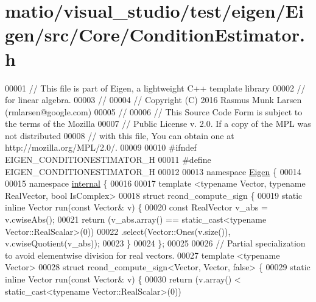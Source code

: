 \hypertarget{matio_2visual__studio_2test_2eigen_2_eigen_2src_2_core_2_condition_estimator_8h_source}{}\section{matio/visual\+\_\+studio/test/eigen/\+Eigen/src/\+Core/\+Condition\+Estimator.h}
\label{matio_2visual__studio_2test_2eigen_2_eigen_2src_2_core_2_condition_estimator_8h_source}

\begin{DoxyCode}
00001 \textcolor{comment}{// This file is part of Eigen, a lightweight C++ template library}
00002 \textcolor{comment}{// for linear algebra.}
00003 \textcolor{comment}{//}
00004 \textcolor{comment}{// Copyright (C) 2016 Rasmus Munk Larsen (rmlarsen@google.com)}
00005 \textcolor{comment}{//}
00006 \textcolor{comment}{// This Source Code Form is subject to the terms of the Mozilla}
00007 \textcolor{comment}{// Public License v. 2.0. If a copy of the MPL was not distributed}
00008 \textcolor{comment}{// with this file, You can obtain one at http://mozilla.org/MPL/2.0/.}
00009 
00010 \textcolor{preprocessor}{#ifndef EIGEN\_CONDITIONESTIMATOR\_H}
00011 \textcolor{preprocessor}{#define EIGEN\_CONDITIONESTIMATOR\_H}
00012 
00013 \textcolor{keyword}{namespace }\hyperlink{namespace_eigen}{Eigen} \{
00014 
00015 \textcolor{keyword}{namespace }\hyperlink{namespaceinternal}{internal} \{
00016 
00017 \textcolor{keyword}{template} <\textcolor{keyword}{typename} Vector, \textcolor{keyword}{typename} RealVector, \textcolor{keywordtype}{bool} IsComplex>
00018 \textcolor{keyword}{struct }rcond\_compute\_sign \{
00019   \textcolor{keyword}{static} \textcolor{keyword}{inline} Vector run(\textcolor{keyword}{const} Vector& v) \{
00020     \textcolor{keyword}{const} RealVector v\_abs = v.cwiseAbs();
00021     \textcolor{keywordflow}{return} (v\_abs.array() == \textcolor{keyword}{static\_cast<}typename Vector::RealScalar\textcolor{keyword}{>}(0))
00022             .select(Vector::Ones(v.size()), v.cwiseQuotient(v\_abs));
00023   \}
00024 \};
00025 
00026 \textcolor{comment}{// Partial specialization to avoid elementwise division for real vectors.}
00027 \textcolor{keyword}{template} <\textcolor{keyword}{typename} Vector>
00028 \textcolor{keyword}{struct }rcond\_compute\_sign<Vector, Vector, false> \{
00029   \textcolor{keyword}{static} \textcolor{keyword}{inline} Vector run(\textcolor{keyword}{const} Vector& v) \{
00030     \textcolor{keywordflow}{return} (v.array() < \textcolor{keyword}{static\_cast<}typename Vector::RealScalar\textcolor{keyword}{>}(0))

\end{DoxyCode}
